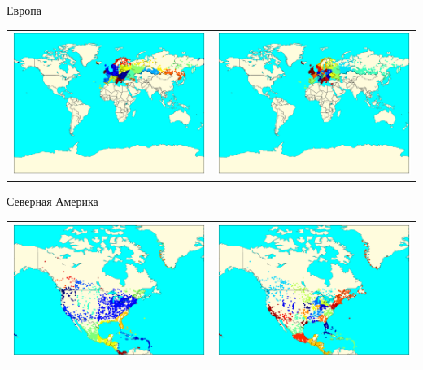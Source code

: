\documentclass[12pt, a4paper]{article}
\begin{document}
\begin{center}
			Европа

			\begin{tabular}{c c}
				\includegraphics[width=8cm]{EU_k_means.pdf} &
				\includegraphics[width=8cm]{EU_k_medoids.pdf} \\
			\end{tabular}

			Северная Америка

			\begin{tabular}{c c}
				\includegraphics[width=8cm]{NA_k_means.pdf} &
				\includegraphics[width=8cm]{NA_k_medoids.pdf} \\
			\end{tabular}


\end{center}
\end{document}
